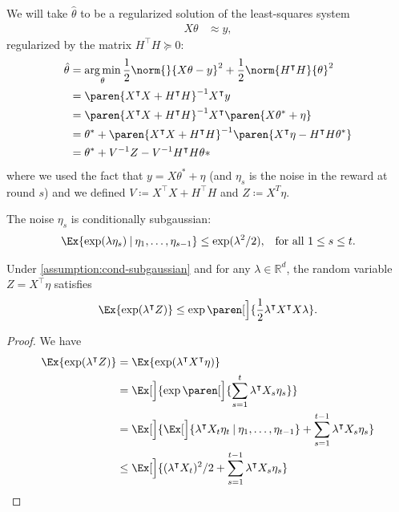 \documentclass{article}
\newcommand{\defeq}{\coloneq}
\newcommand{\inv}[1]{#1^{-1}}
\newcommand{\Real}{\mathds{R}}
\DeclareMathOperator*{\argmin}{arg\,min}
\newcommand\given[1][\delimsize]{%
  \providecommand{\delimsize}{}
  \nonscript\:#1\vert\allowbreak\nonscript\:\mathopen{}
}
\DeclarePairedDelimiter{\paren}()
\newcommand{\transp}[1]{#1^\intercal}
\begin{document}
We will take $\hat{\theta}$ to be a regularized solution of the
least-squares system
\begin{align*}
  X\theta &\approx y,
\end{align*}
regularized by the matrix $\transp{H} H \succeq 0$:
\begin{align*}
  \hat{\theta} &= \argmin_\theta \frac{1}{2}\norm{}{X\theta - y}^2 + \frac{1}{2}\norm{\transp{H}H}{\theta}^2 \\
               &= \inv{\paren{\transp{X}X + \transp{H}H}} \transp{X}y \\
               &= \inv{\paren{\transp{X}X + \transp{H}H}} \transp{X} \paren{X\theta^* + \eta} \\
               &= \theta^* + \inv{\paren{\transp{X}X + \transp{H}H}}\paren{\transp{X}\eta - \transp{H}H\theta^*} \\
               &= \theta^* + \inv{V}Z - \inv{V}\transp{H}H\theta*
\end{align*}
where we used the fact that $y = X\theta^* + \eta$ (and $\eta_s$ is the
noise in the reward at round $s$) and we defined $V \defeq \transp{X}X +
\transp{H}H$ and $Z\defeq X^T\eta$.

\begin{assumption}\label{assumption:cond-subgaussian}
  The noise $\eta_s$ is conditionally subgaussian:
  \begin{align*}
    \Ex{\exp(\lambda\eta_s) \given \eta_1,\dotsc,\eta_{s-1}} &\le \exp(\lambda^2/2),
    &\text{for all } 1 \le s \le t.
  \end{align*}
\end{assumption}

\begin{lemma}
  Under \cref{assumption:cond-subgaussian} and for any $\lambda\in\Real^d$, the random variable $Z =
  \transp{X}\eta$ satisfies
  \begin{align*}
    \Ex{\exp(\transp{\lambda}Z)} \le \exp\paren[\Big]{\frac{1}{2}\transp{\lambda}\transp{X}X\lambda}.
  \end{align*}

  \begin{proof}
    We have
    \begin{align*}
      \Ex{\exp(\transp{\lambda}Z)}
      &= \Ex{\exp(\transp{\lambda}\transp{X}\eta)} \\
      &= \Ex[\Big]{\exp\paren[\Big]{\sum_{s=1}^t \transp{\lambda}X_s\eta_s}} \\
      &= \Ex[\Big]{\Ex[\Big]{\transp{\lambda}X_t\eta_t \given \eta_1,\dotsc,\eta_{t-1}} + \sum_{s=1}^{t-1}\transp{\lambda}X_s\eta_s} \\
      &\le \Ex[\Big]{(\transp{\lambda}X_t)^2/2 + \sum_{s=1}^{t-1}\transp{\lambda}X_s\eta_s}
    \end{align*}
  \end{proof}
\end{lemma}
\end{document}
